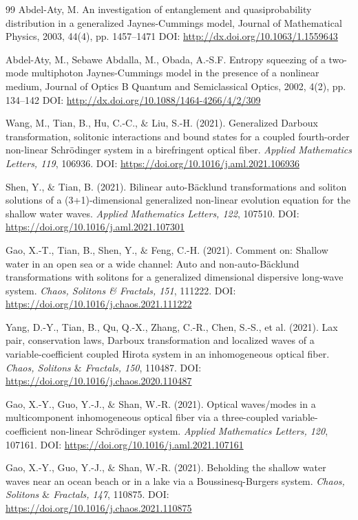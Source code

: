 \documentclass[10pt]{NSP1}
\numberwithin{equation}{section}
\begin{document}
\begin{thebibliography}{99}
 Abdel-Aty, M.
An investigation of entanglement and quasiprobability distribution in a generalized Jaynes-Cummings model, Journal of Mathematical Physics, 2003, 44(4), pp. 1457--1471 DOI: \url{http://dx.doi.org/10.1063/1.1559643}

 Abdel-Aty, M., Sebawe Abdalla, M., Obada, A.-S.F.
Entropy squeezing of a two-mode multiphoton Jaynes-Cummings model in the presence of a nonlinear medium, Journal of Optics B Quantum and Semiclassical Optics, 2002, 4(2), pp. 134--142 DOI: \url{http://dx.doi.org/10.1088/1464-4266/4/2/309}

 Wang, M., Tian, B., Hu, C.-C., ${\&}$ Liu, S.-H. (2021). Generalized Darboux transformation, solitonic interactions and bound states for a coupled fourth-order non-linear Schr\"{o}dinger system in a birefringent optical fiber. \emph{Applied Mathematics Letters, 119}, 106936. DOI: \url{https://doi.org/10.1016/j.aml.2021.106936}

 Shen, Y., ${\&}$ Tian, B. (2021). Bilinear auto-B\"{a}cklund transformations and soliton solutions of a (3+1)-dimensional generalized non-linear evolution equation for the shallow water waves. \emph{Applied Mathematics Letters, 122}, 107510. DOI: \url{https://doi.org/10.1016/j.aml.2021.107301}

 Gao, X.-T., Tian, B., Shen, Y., ${\&}$ Feng, C.-H. (2021). Comment on: Shallow water in an open sea or a wide channel: Auto and non-auto-B\"{a}cklund transformations with solitons for a generalized dimensional dispersive long-wave system. \emph{Chaos, Solitons {\&} Fractals, 151}, 111222. DOI: \url{https://doi.org/10.1016/j.chaos.2021.111222}

 Yang, D.-Y., Tian, B., Qu, Q.-X., Zhang, C.-R., Chen, S.-S., et al. (2021). Lax pair, conservation laws, Darboux transformation and localized waves of a variable-coefficient coupled Hirota system in an inhomogeneous optical fiber. \emph{Chaos, Solitons ${\&}$ Fractals, 150}, 110487. DOI: \url{https://doi.org/10.1016/j.chaos.2020.110487}

 Gao, X.-Y., Guo, Y.-J., ${\&}$ Shan, W.-R. (2021). Optical waves/modes in a multicomponent inhomogeneous optical fiber via a three-coupled variable-coefficient non-linear Schr\"{o}dinger system. \emph{Applied Mathematics Letters, 120}, 107161. DOI: \url{https://doi.org/10.1016/j.aml.2021.107161}

 Gao, X.-Y., Guo, Y.-J., ${\&}$ Shan, W.-R. (2021). Beholding the shallow water waves near an ocean beach or in a lake via a Boussinesq-Burgers system. \emph{Chaos, Solitons ${\&}$ Fractals, 147}, 110875. DOI: \url{https://doi.org/10.1016/j.chaos.2021.110875}


\end{thebibliography}
\end{document}
